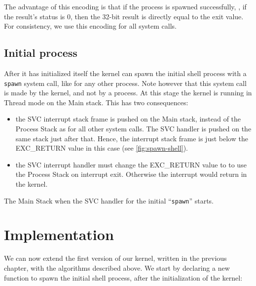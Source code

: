 The advantage of this encoding is that if the process is spawned successfully,
\ie, if the result's status is 0, then the 32-bit result is directly equal to
the exit value. For consistency, we use this encoding for all system calls.

\subsection{Initial process}

After it has initialized itself the kernel can spawn the initial shell process
with a {\tt spawn} system call, like for any other process. Note however that
this system call is made by the kernel, and not by a process. At this stage the
kernel is running in Thread mode on the Main stack. This has two consequences:
\begin{itemize}
  \item the SVC interrupt stack frame is pushed on the Main stack, instead of
  the Process Stack as for all other system calls. The SVC handler is pushed on
  the same stack just after that. Hence, the interrupt stack frame is just
  below the EXC\_RETURN value in this case (see \cref{fig:spawn-shell}).

  \item the SVC interrupt handler must change the EXC\_RETURN value to
   to use the Process Stack on interrupt exit. Otherwise the
  interrupt would return in the kernel.
\end{itemize}

\begin{Figure}
  

  \caption{The Main Stack when the SVC handler for the initial ``{\tt spawn}''
    starts.}\label{fig:spawn-shell}
\end{Figure}

\section{Implementation}


We can now extend the first version of our kernel, written in the previous
chapter, with the algorithms described above. We start by declaring a new
function to spawn the initial shell process, after the initialization of the
kernel:


